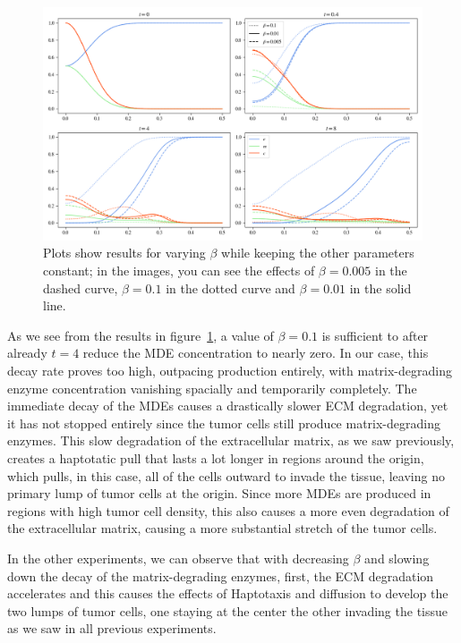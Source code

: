 \begin{figure}[h]
 \centering
 \includegraphics[width=\textwidth]{resources/images/beta_variation.png}
 \caption{Plots show results for varying $\beta$ while keeping the other parameters constant; in the images, you can see the effects of $\beta=0.005$ in the dashed curve, $\beta=0.1$ in the dotted curve and $\beta=0.01$ in the solid line.}
 \label{fig:beta_variation}
\end{figure}
As we see from the results in figure~\ref{fig:beta_variation}, a value of $\beta=0.1$ is sufficient to after already $t=4$ reduce the MDE concentration to nearly zero. In our case, this decay rate proves too high, outpacing production entirely, with matrix-degrading enzyme concentration vanishing spacially and temporarily completely. The immediate decay of the MDEs causes a drastically slower ECM degradation, yet it has not stopped entirely since the tumor cells still produce matrix-degrading enzymes. This slow degradation of the extracellular matrix, as we saw previously, creates a haptotatic pull that lasts a lot longer in regions around the origin, which pulls, in this case, all of the cells outward to invade the tissue, leaving no primary lump of tumor cells at the origin. Since more MDEs are produced in regions with high tumor cell density, this also causes a more even degradation of the extracellular matrix, causing a more substantial stretch of the tumor cells.

In the other experiments, we can observe that with decreasing $\beta$ and slowing down the decay of the matrix-degrading enzymes, first, the ECM degradation accelerates and this causes the effects of Haptotaxis and diffusion to develop the two lumps of tumor cells, one staying at the center the other invading the tissue as we saw in all previous experiments.


